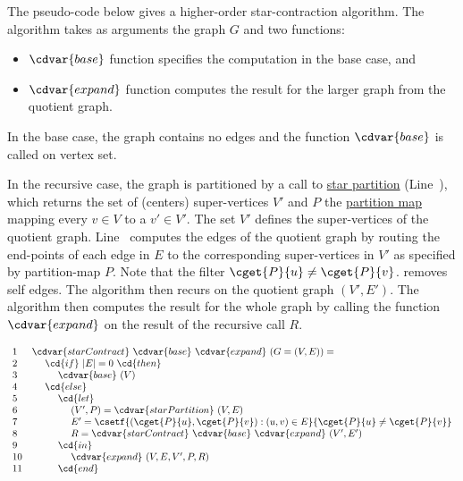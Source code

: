 \begin{algorithm}
\label{alg:graphcon::star-contraction}

The pseudo-code below gives a higher-order
star-contraction algorithm.
%
The algorithm takes as arguments the graph $G$ and two functions:
\begin{itemize}
\item  $\cdvar{base}$ function specifies the computation in the base case, and

\item  $\cdvar{expand}$ function computes the result for the larger
graph from the quotient graph.

\end{itemize}


In the base case, the graph contains no edges and the function
$\cdvar{base}$ is called on vertex set.

In the recursive case, the graph is partitioned by a call to
%
\href{alg:graphcon::star-partition}{star partition} 
(Line~\linegcscpartition{}),
%
which  returns the set of (centers) super-vertices
$V'$ and $P$ the
%
\href{def:graphcon::intro::prelim::partition-map}{partition map}
%
mapping every $v \in V$ to a $v' \in V'$.
%
The set $V'$ defines the super-vertices of the quotient graph.
%
Line~\linegcscedges{} computes the edges of the quotient graph by
routing the end-points of each edge in $E$ to the corresponding
super-vertices in $V'$ as specified by partition-map $P$.
%
Note that the filter $\cget{P}{u} \neq \cget{P}{v}$.
removes self edges.
%
The algorithm then recurs on the quotient graph $(V', E')$.
%
The algorithm then computes the result for the whole graph by calling
the function $\cdvar{expand}$ on the result of the recursive call $R$.

%


\[
\begin{array}{ll}
1 & \cdvar{starContract}~\cdvar{base}~\cdvar{expand}~(G = (V,E)) =
\\ 
2 & ~~~~\cd{if}~|E| = 0~\cd{then}
\\
3 & ~~~~~~~~\cdvar{base}~(V)
\\
4 & ~~~~\cd{else}
\\ 
5 & ~~~~~~~~\cd{let}
\\ 
6 & ~~~~~~~~~~~~(V',P) = \cdvar{starPartition}~(V,E)~ %
\\
7 & ~~~~~~~~~~~~E' = \csetf{(\cget{P}{u},\cget{P}{v}) : (u,v) \in  E}{\cget{P}{u} \neq \cget{P}{v}} 
\\
8 & ~~~~~~~~~~~~R = \cdvar{starContract}~\cdvar{base}~\cdvar{expand}~(V',E')
\\
9 & ~~~~~~~~\cd{in}
\\
10 & ~~~~~~~~~~~~\cdvar{expand}~(V, E, V', P, R)
\\
11 & ~~~~~~~~\cd{end}
\end{array}
\]
\end{algorithm}

